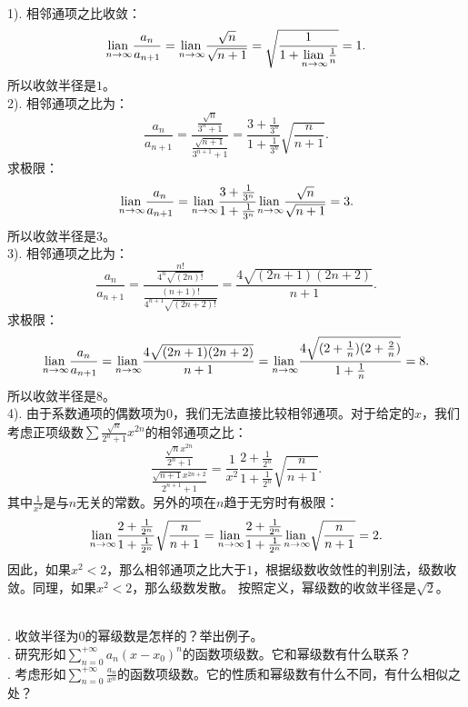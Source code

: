 \documentclass[12pt,UTF8]{ctexbook}
\begin{document}
\begin{so}
    \mbox{} \\
    1). 相邻通项之比收敛：
    $$ \underset{n\to\infty}{\operatorname{lian}\,} \frac{a_n}{a_{n+1}} = \underset{n\to\infty}{\operatorname{lian}\,} \frac{\sqrt{n}}{\sqrt{n+1}} = \sqrt{\frac{1}{1 + \underset{n\to\infty}{\operatorname{lian}\,} \frac{1}{n}}} = 1. $$
    所以收敛半径是$1$。\\
    2). 相邻通项之比为：
    $$ \frac{a_n}{a_{n+1}} = \frac{\frac{\sqrt{n}}{3^n + 1}}{\frac{\sqrt{n+1}}{3^{n+1} + 1}} = \frac{3 + \frac{1}{3^n}}{1 + \frac{1}{3^n}}\sqrt{\frac{n}{n+1}}. $$
    求极限：
    $$ \underset{n\to\infty}{\operatorname{lian}\,} \frac{a_n}{a_{n+1}} = \underset{n\to\infty}{\operatorname{lian}\,} \frac{3 + \frac{1}{3^n}}{1 + \frac{1}{3^n}}\underset{n\to\infty}{\operatorname{lian}\,} \frac{\sqrt{n}}{\sqrt{n+1}} = 3. $$
    所以收敛半径是$3$。\\
    3). 相邻通项之比为：
    $$ \frac{a_n}{a_{n+1}} = \frac{\frac{n!}{4^n\sqrt{(2n)!}}}{\frac{(n+1)!}{4^{n+1}\sqrt{(2n+2)!}}} = \frac{4\sqrt{(2n+1)(2n+2)}}{n+1}. $$
    求极限：
    $$ \underset{n\to\infty}{\operatorname{lian}\,} \frac{a_n}{a_{n+1}} = \underset{n\to\infty}{\operatorname{lian}\,}\frac{4\sqrt{(2n+1)(2n+2)}}{n+1} = \underset{n\to\infty}{\operatorname{lian}\,}\frac{4\sqrt{(2+\frac{1}{n})(2+\frac{2}{n})}}{1+\frac{1}{n}} = 8. $$
    所以收敛半径是$8$。\\
    4). 由于系数通项的偶数项为$0$，我们无法直接比较相邻通项。对于给定的$x$，我们考虑正项级数$\sum \frac{\sqrt{n}}{2^n+1} x^{2n}$的相邻通项之比：
    $$ \frac{\frac{\sqrt{n}x^{2n}}{2^n+1}}{\frac{\sqrt{n+1}x^{2n+2}}{2^{n+1}+1}} = \frac{1}{x^2}\frac{2 + \frac{1}{2^n}}{1 + \frac{1}{2^n}}\sqrt{\frac{n}{n+1}}. $$
    其中$\frac{1}{x^2}$是与$n$无关的常数。另外的项在$n$趋于无穷时有极限：
    $$ \underset{n\to\infty}{\operatorname{lian}\,}\frac{2 + \frac{1}{2^n}}{1 + \frac{1}{2^n}}\sqrt{\frac{n}{n+1}} = \underset{n\to\infty}{\operatorname{lian}\,}\frac{2 + \frac{1}{2^n}}{1 + \frac{1}{2^n}}\underset{n\to\infty}{\operatorname{lian}\,}\sqrt{\frac{n}{n+1}} = 2. $$
    因此，如果$x^2<2$，那么相邻通项之比大于$1$，根据级数收敛性的判别法，级数收敛。同理，如果$x^2<2$，那么级数发散。
    按照定义，幂级数的收敛半径是$\sqrt{2}$。

\end{so}

\begin{sk}
    \mbox{} \\
    . 收敛半径为$0$的幂级数是怎样的？举出例子。 \\
    . 研究形如$\sum_{n=0}^{+\infty} a_n (x - x_0)^n$的函数项级数。它和幂级数有什么联系？\\
    . 考虑形如$\sum_{n=0}^{+\infty} \frac{a_n}{x^n}$的函数项级数。它的性质和幂级数有什么不同，有什么相似之处？
\end{sk}
\end{document}

